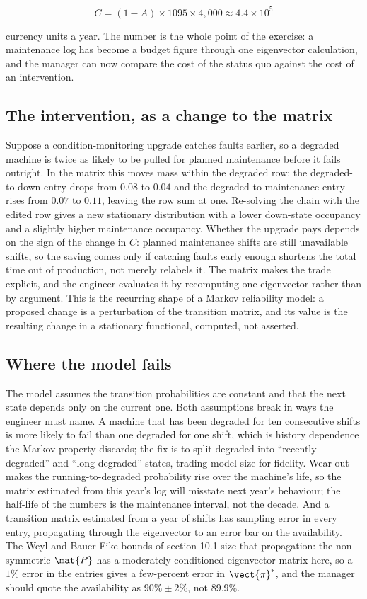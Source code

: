 \[
C = (1 - A) \times 1095 \times 4{,}000 \approx 4.4 \times 10^{5}
\]

currency units a year. The number is the whole point of the exercise:
a maintenance log has become a budget figure through one eigenvector
calculation, and the manager can now compare the cost of the status
quo against the cost of an intervention.

\subsection{The intervention, as a change to the matrix}

Suppose a condition-monitoring upgrade catches faults earlier, so a
degraded machine is twice as likely to be pulled for planned
maintenance before it fails outright. In the matrix this moves mass
within the degraded row: the degraded-to-down entry drops from $0.08$
to $0.04$ and the degraded-to-maintenance entry rises from $0.07$ to
$0.11$, leaving the row sum at one. Re-solving the chain with the
edited row gives a new stationary distribution with a lower down-state
occupancy and a slightly higher maintenance occupancy. Whether the
upgrade pays depends on the sign of the change in $C$: planned
maintenance shifts are still unavailable shifts, so the saving comes
only if catching faults early enough shortens the total time out of
production, not merely relabels it. The matrix makes the trade
explicit, and the engineer evaluates it by recomputing one eigenvector
rather than by argument. This is the recurring shape of a Markov
reliability model: a proposed change is a perturbation of the
transition matrix, and its value is the resulting change in a
stationary functional, computed, not asserted.

\subsection{Where the model fails}

The model assumes the transition probabilities are constant and that
the next state depends only on the current one. Both assumptions break
in ways the engineer must name. A machine that has been degraded for
ten consecutive shifts is more likely to fail than one degraded for
one shift, which is history dependence the Markov property discards;
the fix is to split degraded into ``recently degraded'' and ``long
degraded'' states, trading model size for fidelity. Wear-out makes the
running-to-degraded probability rise over the machine's life, so the
matrix estimated from this year's log will misstate next year's
behaviour; the half-life of the numbers is the maintenance interval,
not the decade. And a transition matrix estimated from a year of
shifts has sampling error in every entry, propagating through the
eigenvector to an error bar on the availability. The Weyl and
Bauer-Fike bounds of section 10.1 size that propagation: the
non-symmetric $\mat{P}$ has a moderately conditioned eigenvector
matrix here, so a $1\%$ error in the entries gives a few-percent error
in $\vect{\pi}^{*}$, and the manager should quote the availability as
$90\% \pm 2\%$, not $89.9\%$.

